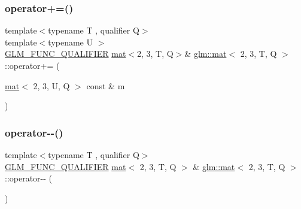 \subsubsection{\texorpdfstring{operator+=()}{operator+=()}\hspace{0.1cm}{\footnotesize\ttfamily [4/4]}}
{\footnotesize\ttfamily template$<$typename T , qualifier Q$>$ \\
template$<$typename U $>$ \\
\hyperlink{setup_8hpp_a33fdea6f91c5f834105f7415e2a64407}{G\+L\+M\+\_\+\+F\+U\+N\+C\+\_\+\+Q\+U\+A\+L\+I\+F\+I\+ER} \hyperlink{structglm_1_1mat}{mat}$<$2, 3, T, Q$>$\& \hyperlink{structglm_1_1mat}{glm\+::mat}$<$ 2, 3, T, Q $>$\+::operator+= (\begin{DoxyParamCaption}\item[{\hyperlink{structglm_1_1mat}{mat}$<$ 2, 3, U, Q $>$ const \&}]{m }\end{DoxyParamCaption})}

\mbox{\label{structglm_1_1mat_3_012_00_013_00_01_t_00_01_q_01_4_a828a596a4d82b6e970290f9c0449da87}} 
\subsubsection{\texorpdfstring{operator-\/-\/()}{operator--()}\hspace{0.1cm}{\footnotesize\ttfamily [1/2]}}
{\footnotesize\ttfamily template$<$typename T , qualifier Q$>$ \\
\hyperlink{setup_8hpp_a33fdea6f91c5f834105f7415e2a64407}{G\+L\+M\+\_\+\+F\+U\+N\+C\+\_\+\+Q\+U\+A\+L\+I\+F\+I\+ER} \hyperlink{structglm_1_1mat}{mat}$<$ 2, 3, T, Q $>$ \& \hyperlink{structglm_1_1mat}{glm\+::mat}$<$ 2, 3, T, Q $>$\+::operator-\/-\/ (\begin{DoxyParamCaption}{ }\end{DoxyParamCaption})}

\mbox{\label{structglm_1_1mat_3_012_00_013_00_01_t_00_01_q_01_4_ad500baad9a2da00e3f22e9776b9a3883}} 
